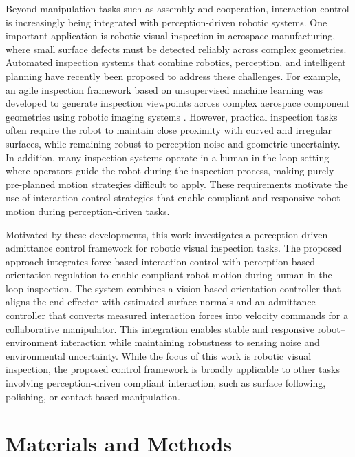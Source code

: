 \documentclass[journal]{IEEEtran}
\begin{document}
Beyond manipulation tasks such as assembly and cooperation, interaction control is increasingly being integrated with perception-driven robotic systems. One important application is robotic visual inspection in aerospace manufacturing, where small surface defects must be detected reliably across complex geometries. Automated inspection systems that combine robotics, perception, and intelligent planning have recently been proposed to address these challenges. For example, an agile inspection framework based on unsupervised machine learning was developed to generate inspection viewpoints across complex aerospace component geometries using robotic imaging systems \cite{Nandagopal2024}. However, practical inspection tasks often require the robot to maintain close proximity  with curved and irregular surfaces, while remaining robust to perception noise and geometric uncertainty. In addition, many inspection systems operate in a human-in-the-loop setting where operators guide the robot during the inspection process, making purely pre-planned motion strategies difficult to apply. These requirements motivate the use of interaction control strategies that enable compliant and responsive robot motion during perception-driven tasks.

Motivated by these developments, this work investigates a perception-driven admittance control framework for robotic visual inspection tasks. The proposed approach integrates force-based interaction control with perception-based orientation regulation to enable compliant robot motion during human-in-the-loop inspection. The system combines a vision-based orientation controller that aligns the end-effector with estimated surface normals and an admittance controller that converts measured interaction forces into velocity commands for a collaborative manipulator. This integration enables stable and responsive robot–environment interaction while maintaining robustness to sensing noise and environmental uncertainty. While the focus of this work is robotic visual inspection, the proposed control framework is broadly applicable to other tasks involving perception-driven compliant interaction, such as surface following, polishing, or contact-based manipulation.



\section{Materials and Methods}
\end{document}

